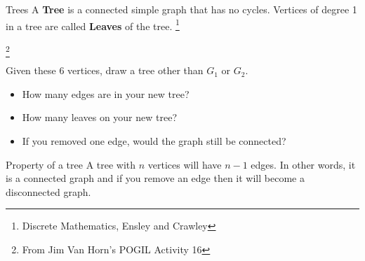     \newpage

    \begin{intro}{Trees}
        A \textbf{Tree} is a connected simple graph that has no cycles.
        Vertices of degree 1 in a tree are called \textbf{Leaves} of the tree.
        \footnote{Discrete Mathematics, Ensley and Crawley}
    \end{intro}

    \begin{questionNOGRADE}{\thequestion}
        \footnote{From Jim Van Horn's POGIL Activity 16}

        Given these 6 vertices, draw a tree other than $G_{1}$ or $G_{2}$.
        
        \begin{center}
        \end{center}


        \begin{itemize}
            \item[a.]   How many edges are in your new tree?
                
            \item[b.]   How many leaves on your new tree?
                
            \item[c.]   If you removed one edge, would the graph still be connected?
        \end{itemize}
    \end{questionNOGRADE}

    \begin{intro}{Property of a tree}
        A tree with $n$ vertices will have $n-1$ edges. In other words,
        it is a connected graph and if you remove an edge then it will
        become a disconnected graph.
    \end{intro}

